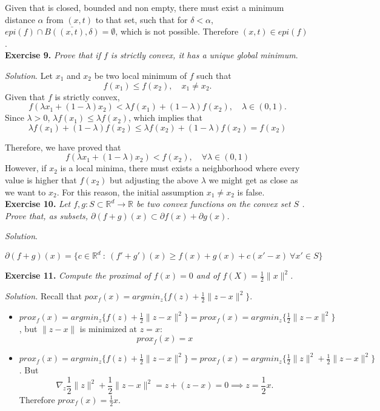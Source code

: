 \documentclass[11pt]{article}
\begin{document}
Given that is closed, bounded and non empty, there must exist a minimum distance \( \alpha \)  from \( (x,t) \) to that set, such that for \( \delta < \alpha \), \( epi(f) \cap \bar{B((x,t), \delta)} = \emptyset \), which is not possible. Therefore \( (x,t) \in epi(f) \).\\   

\textbf{Exercise 9. }\emph{Prove that if \( f \)  is strictly convex, it has a unique global minimum}.

\emph{Solution}. Let \( x_1 \) and \( x_2 \) be two local minimum of  \( f \) such that 
\[
     f(x_1) \leq f(x_2), \quad x_1 \neq x_2.
\]
Given that \( f \) is strictly convex, 
\[
     f(\lambda x_1 + (1-\lambda)x_2) < \lambda f(x_1) + (1-\lambda)f(x_2), \quad \lambda \in (0,1).
\]
Since \( \lambda >0 \), \( \lambda f(x_1) \leq \lambda f(x_2) \), which implies that 
\[
      \lambda f(x_1) + (1-\lambda)f(x_2) \leq  \lambda f(x_2) + (1-\lambda)f(x_2) = f(x_2)
\]  

Therefore, we have proved that 
\[
      f(\lambda x_1 + (1-\lambda)x_2) < f(x_2), \quad \forall \lambda \in (0,1)
\]
However, if \( x_2 \) is a local minima, there must exists a neighborhood where every value is higher that \( f(x_2) \) but adjusting the above \( \lambda \) we might get as close as we want to \( x_2 \). For this reason, the initial assumption \( x_1 \neq x_2 \) is false.\\   

\textbf{Exercise 10. }\emph{Let \( f,g: S \subset \mathbb{R}^d \to \mathbb{R} \)  be two convex functions on the convex set \( S \) . Prove that, as subsets, \( \partial(f+g)(x) \subset \partial f(x) + \partial g(x) \). }

\emph{Solution}. 

\[
     \partial(f + g)(x) = \{c \in \mathbb{R}^d \ : \ (f' + g')(x) \geq f(x) + g(x) + c(x' - x)\ \forall x' \in S\}
\]

\textbf{Exercise 11. }\emph{Compute the proximal of \( f(x) = 0 \) and of \( f(X) = \frac{1}{2}\|x\|^2 \).}

\emph{Solution. }Recall that \( pox_f(x) = argmin_z\{f(z) + \frac{1}{2} \|z - x\|^2 \} \).
\begin{itemize}
    \item \( prox_f(x) = argmin_z\{f(z) + \frac{1}{2} \|z - x\|^2 \}  =  prox_f(x) = argmin_z\{ \frac{1}{2} \|z - x\|^2 \} \), but \( \|z-x\| \) is minimized at \( z = x \):
    \[
         prox_f(x) = x
    \]
    \item  \( prox_f(x) = argmin_z\{f(z) + \frac{1}{2} \|z - x\|^2 \}  =  prox_f(x) = argmin_z\{\frac{1}{2}\|z\|^2 + \frac{1}{2} \|z - x\|^2 \} \). But 
    \[
         \nabla_z \frac{1}{2} \|z\|^2 + \frac{1}{2}\|z-x\|^2 = z + (z - x) = 0 \implies z = \frac{1}{2}x.
    \]
    Therefore \( prox_f(x) = \frac{1}{2}x \).
\end{itemize}
\end{document}
